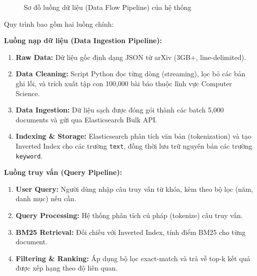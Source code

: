 \begin{figure}[H]
\caption{Sơ đồ luồng dữ liệu (Data Flow Pipeline) của hệ thống}
\label{fig:data-flow}
\end{figure}

\noindent Quy trình bao gồm hai luồng chính:

\textbf{Luồng nạp dữ liệu (Data Ingestion Pipeline):}
\begin{enumerate}
    \item \textbf{Raw Data:} Dữ liệu gốc định dạng JSON từ arXiv (3GB+, line-delimited).
    \item \textbf{Data Cleaning:} Script Python đọc từng dòng (streaming), lọc bỏ các bản ghi lỗi, và trích xuất tập con 100,000 bài báo thuộc lĩnh vực Computer Science.
    \item \textbf{Data Ingestion:} Dữ liệu sạch được đóng gói thành các batch 5,000 documents và gửi qua Elasticsearch Bulk API.
    \item \textbf{Indexing \& Storage:} Elasticsearch phân tích văn bản (tokenization) và tạo Inverted Index cho các trường \texttt{text}, đồng thời lưu trữ nguyên bản các trường \texttt{keyword}.
\end{enumerate}

\textbf{Luồng truy vấn (Query Pipeline):}
\begin{enumerate}
    \item \textbf{User Query:} Người dùng nhập câu truy vấn từ khóa, kèm theo bộ lọc (năm, danh mục) nếu cần.
    \item \textbf{Query Processing:} Hệ thống phân tích cú pháp (tokenize) câu truy vấn.
    \item \textbf{BM25 Retrieval:} Đối chiếu với Inverted Index, tính điểm BM25 cho từng document.
    \item \textbf{Filtering \& Ranking:} Áp dụng bộ lọc exact-match và trả về top-k kết quả được xếp hạng theo độ liên quan.
\end{enumerate}

